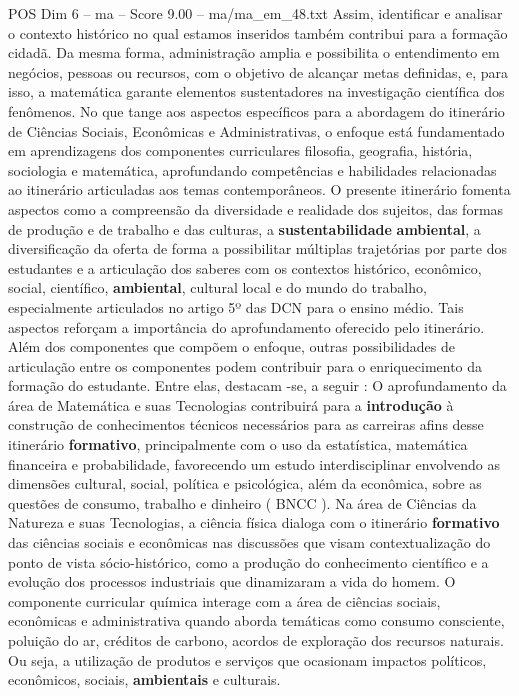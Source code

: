 \begin{textsample}{POS Dim 6 – ma – Score 9.00 – ma/ma\_em\_48.txt}
Assim, identificar e analisar o contexto histórico no qual estamos inseridos também contribui para a formação cidadã.
Da mesma forma, administração amplia e possibilita o entendimento em negócios, pessoas ou recursos, com o objetivo de alcançar metas definidas, e, para isso, a matemática garante elementos sustentadores na investigação científica dos fenômenos.
No que tange aos aspectos específicos para a abordagem do itinerário de Ciências Sociais, Econômicas e Administrativas, o enfoque está fundamentado em aprendizagens dos componentes curriculares filosofia, geografia, história, sociologia e matemática, aprofundando competências e habilidades relacionadas ao itinerário articuladas aos temas contemporâneos.
O presente itinerário fomenta aspectos como a compreensão da diversidade e realidade dos sujeitos, das formas de produção e de trabalho e das culturas, a \textbf{sustentabilidade} \textbf{ambiental}, a diversificação da oferta de forma a possibilitar múltiplas trajetórias por parte dos estudantes e a articulação dos saberes com os contextos histórico, econômico, social, científico, \textbf{ambiental}, cultural local e do mundo do trabalho, especialmente articulados no artigo 5º das DCN para o ensino médio.
Tais aspectos reforçam a importância do aprofundamento oferecido pelo itinerário.
Além dos componentes que compõem o enfoque, outras possibilidades de articulação entre os componentes podem contribuir para o enriquecimento da formação do estudante.
Entre elas, destacam -se, a seguir : O aprofundamento da área de Matemática e suas Tecnologias contribuirá para a \textbf{introdução} à construção de conhecimentos técnicos necessários para as carreiras afins desse itinerário \textbf{formativo}, principalmente com o uso da estatística, matemática financeira e probabilidade, favorecendo um estudo interdisciplinar envolvendo as dimensões cultural, social, política e psicológica, além da econômica, sobre as questões de consumo, trabalho e dinheiro ( BNCC ).
Na área de Ciências da Natureza e suas Tecnologias, a ciência física dialoga com o itinerário \textbf{formativo} das ciências sociais e econômicas nas discussões que visam contextualização do ponto de vista sócio-histórico, como a produção do conhecimento científico e a evolução dos processos industriais que dinamizaram a vida do homem.
O componente curricular química interage com a área de ciências sociais, econômicas e administrativa quando aborda temáticas como consumo consciente, poluição do ar, créditos de carbono, acordos de exploração dos recursos naturais.
Ou seja, a utilização de produtos e serviços que ocasionam impactos políticos, econômicos, sociais, \textbf{ambientais} e culturais.

\end{textsample}
